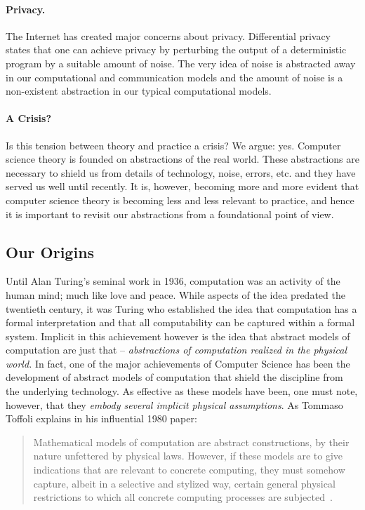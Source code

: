 \documentclass{article}
\begin{document}
\paragraph*{Privacy.} 
The Internet has created major concerns about privacy. Differential
privacy~\cite{dwork:differential} states that one can achieve privacy
by perturbing the output of a deterministic program by a suitable
amount of noise. The very idea of noise is abstracted away in our
computational and communication models and the amount of noise is a
non-existent abstraction in our typical computational models.

\paragraph*{A Crisis?}
Is this tension between theory and practice a crisis?  We argue:
yes. Computer science theory is founded on abstractions of the real
world. These abstractions are necessary to shield us from details of
technology, noise, errors, etc. and they have served us well until
recently.  It is, however, becoming more and more evident that
computer science theory is becoming less and less relevant to
practice, and hence it is important to revisit our abstractions from a
foundational point of view.

\subsection{Our Origins} 
 
Until Alan Turing's seminal work in 1936, computation was an activity
of the human mind; much like love and peace. While aspects of the idea
predated the twentieth century, it was Turing who established the idea
that computation has a formal interpretation and that all
computability can be captured within a formal system. Implicit in this
achievement however is the idea that abstract models of computation
are just that -- \emph{abstractions of computation realized in the
  physical world.}  In fact, one of the major achievements of Computer
Science has been the development of abstract models of computation
that shield the discipline from the underlying technology. As
effective as these models have been, one must note, however, that they
\emph{embody several implicit physical assumptions}.  As Tommaso
Toffoli explains in his influential 1980 paper:

{\begin{quote} Mathematical models of computation are abstract
  constructions, by their nature unfettered by physical laws. However,
  if these models are to give indications that are relevant to
  concrete computing, they must somehow capture, albeit in a selective
  and stylized way, certain general physical restrictions to which all
  concrete computing processes are subjected~\cite{Toffoli:1980}.
\end{quote}}
\end{document}
